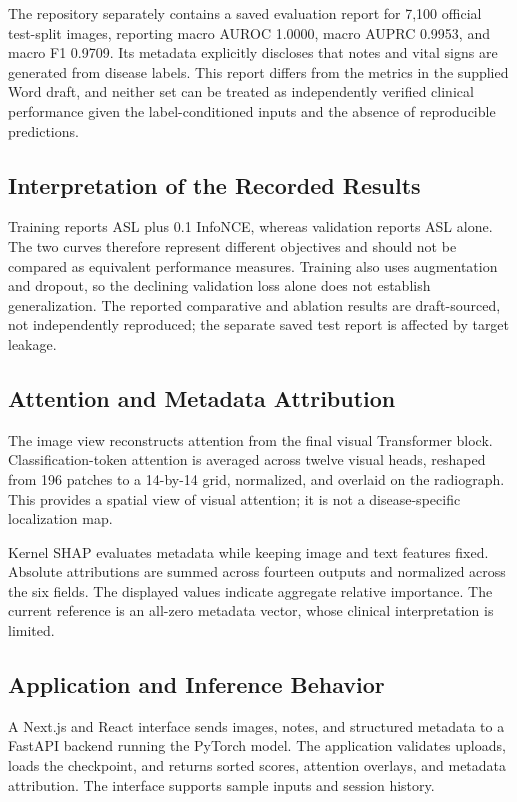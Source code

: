 \documentclass[conference,letterpaper]{IEEEtran}
\begin{document}
The repository separately contains a saved evaluation report for 7,100 official test-split images, reporting macro AUROC 1.0000, macro AUPRC 0.9953, and macro F1 0.9709. Its metadata explicitly discloses that notes and vital signs are generated from disease labels. This report differs from the metrics in the supplied Word draft, and neither set can be treated as independently verified clinical performance given the label-conditioned inputs and the absence of reproducible predictions.

\subsection{Interpretation of the Recorded Results}

Training reports ASL plus 0.1 InfoNCE, whereas validation reports ASL alone. The two curves therefore represent different objectives and should not be compared as equivalent performance measures. Training also uses augmentation and dropout, so the declining validation loss alone does not establish generalization. The reported comparative and ablation results are draft-sourced, not independently reproduced; the separate saved test report is affected by target leakage.


\subsection{Attention and Metadata Attribution}

The image view reconstructs attention from the final visual Transformer block. Classification-token attention is averaged across twelve visual heads, reshaped from 196 patches to a 14-by-14 grid, normalized, and overlaid on the radiograph. This provides a spatial view of visual attention; it is not a disease-specific localization map.

Kernel SHAP \cite{lundberg2017} evaluates metadata while keeping image and text features fixed. Absolute attributions are summed across fourteen outputs and normalized across the six fields. The displayed values indicate aggregate relative importance. The current reference is an all-zero metadata vector, whose clinical interpretation is limited.

\subsection{Application and Inference Behavior}

A Next.js and React interface sends images, notes, and structured metadata to a FastAPI backend running the PyTorch model. The application validates uploads, loads the checkpoint, and returns sorted scores, attention overlays, and metadata attribution. The interface supports sample inputs and session history.
\end{document}
